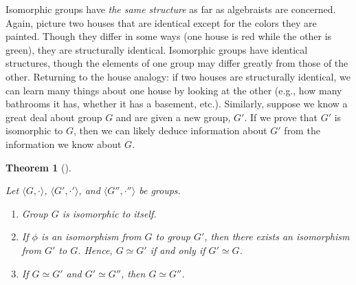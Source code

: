 \documentclass[10pt,]{book}
\theoremstyle{plain}
\newtheorem{theorem}{Theorem}[section]
\theoremstyle{definition}
\theoremstyle{definition}
\theoremstyle{definition}
\theoremstyle{definition}
\numberwithin{equation}{section}
\begin{document}
    Isomorphic groups have \emph{the same structure} as far as
    algebraists are concerned. Again, picture two houses that are
    identical except for the colors they are painted. Though they
    differ in some ways (one house is red while the other is
    green), they are structurally identical. Isomorphic groups
    have identical structures, though the elements of one group may
    differ greatly from those of the other. Returning to the house
    analogy: if two houses are structurally identical, we can learn
    many things about one house by looking at the other (e.g., how
    many bathrooms it has, whether it has a basement, etc.).
    Similarly, suppose we know a great deal about group \(G\) and are
    given a new group, \(G'\). If we prove that \(G'\) is isomorphic
    to \(G\), then we can likely deduce information about \(G'\) from
    the information we know about \(G\).
\begin{theorem}[{}]\label{groupisoequiv}

        Let \(\langle G,\cdot\rangle\), \(\langle G',\cdot'\rangle\), and \(\langle G'',\cdot''\rangle\) be groups.
        \leavevmode%
\begin{enumerate}
\item\hypertarget{li-141}{}
              Group \(G\) is isomorphic to itself.
\item\hypertarget{li-142}{}
              If \(\phi\) is an isomorphism from \(G\) to group \(G'\), then there exists an isomorphism from \(G'\) to \(G\). Hence, \(G\simeq G'\) if and only if \(G'\simeq G\).
\item\hypertarget{li-143}{}
              If \(G\simeq G'\) and \(G'\simeq G''\), then \(G\simeq G''\).
\end{enumerate}

\end{theorem}
\end{document}
